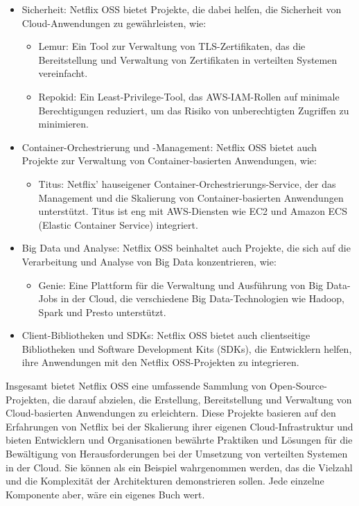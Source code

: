 \begin{itemize}
\begin{itemize}
\end{itemize}
\item Sicherheit: Netflix OSS bietet Projekte, die dabei helfen, die Sicherheit von Cloud-Anwendungen zu gewährleisten, wie:
\begin{itemize}
\item Lemur: Ein Tool zur Verwaltung von TLS-Zertifikaten, das die Bereitstellung und Verwaltung von Zertifikaten in verteilten Systemen vereinfacht.
\item Repokid: Ein Least-Privilege-Tool, das AWS-IAM-Rollen auf minimale Berechtigungen reduziert, um das Risiko von unberechtigten Zugriffen zu minimieren.
\end{itemize}
\item Container-Orchestrierung und -Management: Netflix OSS bietet auch Projekte zur Verwaltung von Container-basierten Anwendungen, wie:
\begin{itemize}
\item Titus: Netflix' hauseigener Container-Orchestrierungs-Service, der das Management und die Skalierung von Container-basierten Anwendungen unterstützt. Titus ist eng mit AWS-Diensten wie EC2 und Amazon ECS (Elastic Container Service) integriert.
\end{itemize}
\item Big Data und Analyse: Netflix OSS beinhaltet auch Projekte, die sich auf die Verarbeitung und Analyse von Big Data konzentrieren, wie:
\begin{itemize}
\item Genie: Eine Plattform für die Verwaltung und Ausführung von Big Data-Jobs in der Cloud, die verschiedene Big Data-Technologien wie Hadoop, Spark und Presto unterstützt.
\end{itemize}
\item Client-Bibliotheken und SDKs: Netflix OSS bietet auch clientseitige Bibliotheken und Software Development Kits (SDKs), die Entwicklern helfen, ihre Anwendungen mit den Netflix OSS-Projekten zu integrieren.
\end{itemize}
Insgesamt bietet Netflix OSS eine umfassende Sammlung von Open-Source-Projekten, die darauf abzielen, die Erstellung, Bereitstellung und Verwaltung von Cloud-basierten Anwendungen zu erleichtern. Diese Projekte basieren auf den Erfahrungen von Netflix bei der Skalierung ihrer eigenen Cloud-Infrastruktur und bieten Entwicklern und Organisationen bewährte Praktiken und Lösungen für die Bewältigung von Herausforderungen bei der Umsetzung von verteilten Systemen in der Cloud. Sie können als ein Beispiel wahrgenommen werden, das die Vielzahl und die Komplexität der Architekturen demonstrieren sollen. Jede einzelne Komponente aber, wäre ein eigenes Buch wert. 

